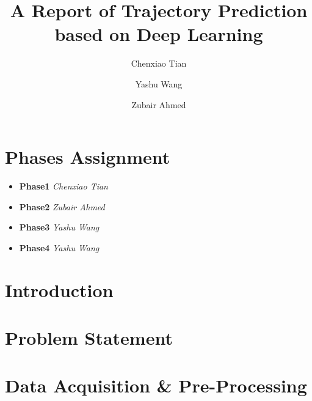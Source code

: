 \documentclass[sigconf]{acmart}
\begin{document}
\title{A Report of Trajectory Prediction based on Deep Learning}


\author{Chenxiao Tian}

\author{Yashu Wang}

\author{Zubair Ahmed}

\renewcommand{\shortauthors}{team 4: Trajectory Prediction}

\begin{abstract}
    
\end{abstract}

\maketitle
\section*{Phases Assignment}
\begin{itemize}
    \item \textbf{Phase1} \emph{Chenxiao Tian}
    \item \textbf{Phase2} \emph{Zubair Ahmed}
    \item \textbf{Phase3} \emph{Yashu Wang}
    \item \textbf{Phase4} \emph{Yashu Wang}
\end{itemize}


\section*{Introduction}


\section{Problem Statement}



\section{Data Acquisition \& Pre-Processing}

\end{document}
